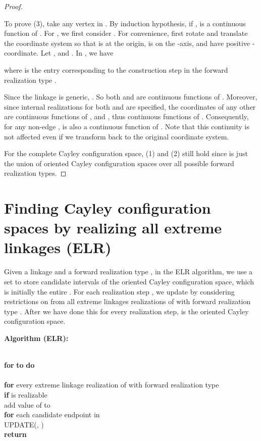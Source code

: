 \documentclass[secthm,amsthm,english]{article}
\theoremstyle{definition}
\theoremstyle{remark}
\begin{document}
\begin{proof}
\begin{figure}[h]
\label{F:RccStepN} 
\end{figure}

To prove (3), take any vertex  in . 
By induction hypothesis, if ,  is a continuous function of . 
For ,  we first consider . 
For convenience, first rotate and translate the coordinate system
so that  is at the origin,   is on the -axis, 
and  have positive -coordinate. Let ,
 and .
In , we have




where  is the entry corresponding to the  construction step in the forward realization type .  

Since the linkage is generic, . So both  and  are continuous functions of . 
Moreover, since internal realizations for both  and 
are specified, the coordinates of any other  
are continuous functions of ,  and , 
thus continuous functions of . 
Consequently, for any non-edge , 
 is also a continuous function of .
Note that this continuity is not affected even if we transform back to the original coordinate system. 

For the complete Cayley configuration space, (1) and (2) still hold 
since  is just the union of  oriented Cayley configuration spaces 
over all possible forward realization types.
\end{proof}


\section{Finding Cayley configuration spaces by realizing all extreme linkages (ELR)}
\label{sec:not-low}


Given a linkage  and a forward realization type , 
in the ELR algorithm, 
we use a set  to store candidate intervals of the oriented Cayley configuration space, 
which is initially the entire . 
For each realization step , 
we update  by considering restrictions on  
from all extreme linkages realizations of  with forward realization type . 
After we have done this for every realization step,  is the oriented Cayley configuration space. 


\noindent \textbf{Algorithm (ELR):} 

\indent    \\
\indent \textbf{for}  \textbf{to}  \textbf{do}
		 \\
	\indent \indent 
		 \\
	\indent \indent \textbf{for} every extreme linkage realization  of  with forward realization type \\
		\indent\indent\indent \textbf{if}  is realizable \\
			\indent\indent\indent\indent add  value of  to  \\
	\indent \indent \textbf{for} each candidate endpoint  in  \\
	\indent \indent \indent UPDATE(, ) 
				 \\
\indent \textbf{return} 
\end{document}
